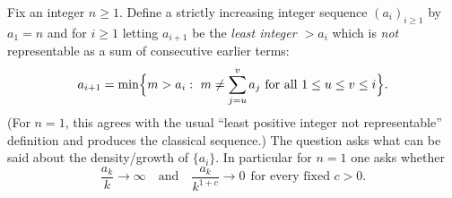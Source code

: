 Fix an integer $n\ge 1$. Define a strictly increasing integer sequence $(a_i)_{i\ge 1}$ by
$a_1=n$ and for $i\ge 1$ letting $a_{i+1}$ be the \emph{least integer $>a_i$} which is \emph{not} representable as a sum of consecutive earlier terms:
\[
a_{i+1}=\min\Bigl\{m>a_i:\ 
m\neq \sum_{j=u}^v a_j\ \text{for all }1\le u\le v\le i
\Bigr\}.
\]
(For $n=1$, this agrees with the usual ``least positive integer not representable'' definition and produces the classical sequence.)
The question asks what can be said about the density/growth of $\{a_i\}$.
In particular for $n=1$ one asks whether
\[
\frac{a_k}{k}\to\infty
\quad\text{and}\quad
\frac{a_k}{k^{1+c}}\to 0\ \ \text{for every fixed }c>0.
\]

